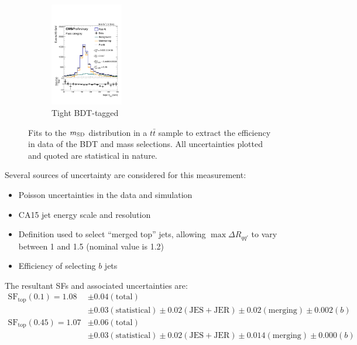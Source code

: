 \begin{figure}[]
\begin{center}
\begin{subfigure}[t]{\textwidth}
\begin{center}
            \includegraphics[width=0.35\textwidth]{figures/toptagging/sf/tight_pass.pdf}
            \caption{Tight BDT-tagged}
    \end{center}
        \end{subfigure}
        \caption{Fits to the $m_{\mathrm{SD}}$ distribution in a $t\bar{t}$ sample to extract the efficiency in data of the BDT and mass selections.
                 All uncertainties plotted and quoted are statistical in nature.}
        \label{fig:jets:sffits}
    \end{center}
\end{figure}

Several sources of uncertainty are considered for this measurement:
\begin{itemize}
    \item Poisson uncertainties in the data and simulation 
    \item CA15 jet energy scale and resolution 
    \item Definition used to select ``merged top'' jets, allowing $\max \Delta R_{qq'}$ to vary between 1 and 1.5 (nominal value is 1.2)
    \item Efficiency of selecting $b$ jets
\end{itemize}
The resultant SFs and associated uncertainties are:
\begin{align}
    \mathrm{SF}_\mathrm{top}(0.1) = 1.08 & \pm 0.04 (\mathrm{total}) \nonumber \\ 
                                         & \pm 0.03 (\mathrm{statistical}) \pm 0.02 (\mathrm{JES+JER}) \pm 0.02 (\mathrm{merging}) \pm 0.002 (b) \nonumber \\ 
    \mathrm{SF}_\mathrm{top}(0.45) = 1.07 & \pm 0.06 (\mathrm{total}) \nonumber \\ 
                                         & \pm 0.03 (\mathrm{statistical}) \pm 0.02 (\mathrm{JES+JER}) \pm 0.014 (\mathrm{merging}) \pm 0.000 (b) 
\end{align}

